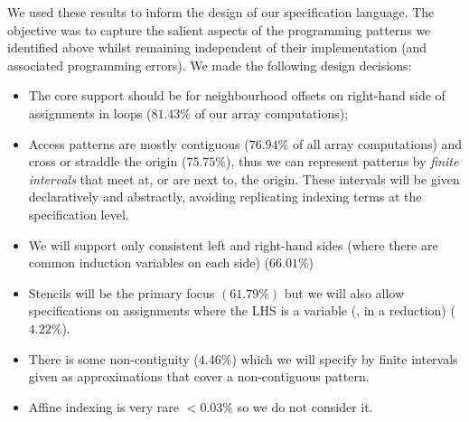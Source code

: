 \noindent
We used these results to inform the design of our specification
language. The objective was to capture the salient aspects of the
programming patterns we identified above whilst remaining independent
of their implementation (and associated programming errors). We made the following design decisions:
%
\begin{itemize}[leftmargin=1.5em]
\item The core support should be for neighbourhood offsets on
  right-hand side of assignments in loops ($81.43\%$ of our array
  computations);

\item Access patterns are mostly contiguous ($76.94\%$ of all array
  computations) and cross or straddle the origin ($75.75\%$), thus we
  can represent patterns by \emph{finite intervals} that meet at, or
  are next to, the origin.  These intervals will be given
  declaratively and abstractly, avoiding replicating indexing terms at
  the specification level.

\item We will support only consistent left and right-hand sides (where
  there are common induction variables on each side) ($66.01\%$)

\item Stencils will be the primary focus $(61.79\%)$ but we will also
  allow specifications on assignments where the LHS is a variable
  (\eg{}, in a reduction) ($4.22\%$).

\item There is some non-contiguity ($4.46\%$) which we will specify by
  finite intervals given as approximations that cover a non-contiguous
  pattern.

\item Affine indexing is very rare $<0.03\%$ so we do not consider it.
\end{itemize}